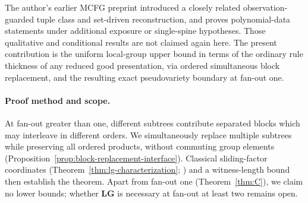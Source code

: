 \documentclass[11pt]{article}
\numberwithin{equation}{section}
\theoremstyle{plain}
\theoremstyle{definition}
\theoremstyle{remark}
\theoremstyle{plain}
\begin{document}
The author's earlier MCFG preprint \cite{KuriyamaMCFGpreprint}
introduced a closely related observation-guarded tuple class and
set-driven reconstruction, and proves polynomial-data statements
under additional exposure or single-spine hypotheses.  Those
qualitative and conditional results are not claimed again here.
The present contribution is the uniform local-group upper bound in
terms of the ordinary rule thickness of any reduced good
presentation, via ordered simultaneous block replacement, and the
resulting exact pseudovariety boundary at fan-out one.

\paragraph{Proof method and scope.}
At fan-out greater than one, different subtrees contribute
separated blocks which may interleave in different orders.
We simultaneously replace multiple subtrees while preserving
all ordered products, without commuting group elements
(Proposition~\ref{prop:block-replacement-interface}).
Classical sliding-factor coordinates
(Theorem~\ref{thm:lg-characterization};
\cite{Straubing1985,Tilson1987,AlmeidaEtAl2009})
and a witness-length bound then establish the theorem.
Apart from fan-out one (Theorem~\ref{thm:C}), we claim no lower
bounds; whether $\mathbf{LG}$ is necessary at fan-out at least two
remains open.
\end{document}
